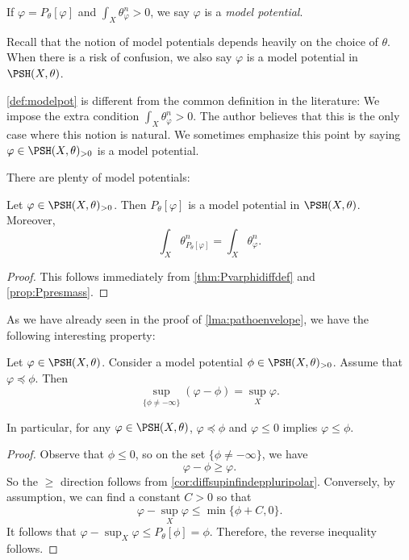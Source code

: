 \begin{definition}\label{def:modelpot}
    If $\varphi=P_{\theta}[\varphi]$ and $\int_X \theta_{\varphi}^n>0$, we say $\varphi$ is a \emph{model potential}.
\end{definition}
Recall that the notion of model potentials depends heavily on the choice of $\theta$. When there is a risk of confusion, we also say $\varphi$ is a model potential in $\PSH(X,\theta)$.

\begin{remark}\label{rmk:envelopes:L267}
\cref{def:modelpot} is different from the common definition in the literature: We impose the extra condition $\int_X \theta_{\varphi}^n>0$. The author believes that this is the only case where this notion is natural. We sometimes emphasize this point by saying $\varphi\in \PSH(X,\theta)_{>0}$ is a model potential.
\end{remark}

There are plenty of model potentials:
\begin{corollary}\label{cor:Psendspotentialtomodel}
    Let $\varphi\in \PSH(X,\theta)_{>0}$. Then $P_{\theta}[\varphi]$ is a model potential in $\PSH(X,\theta)$. Moreover,
    \[
        \int_X \theta_{P_{\theta}[\varphi]}^n=\int_X \theta_{\varphi}^n.
    \]
\end{corollary}
\begin{proof}
    This follows immediately from \cref{thm:Pvarphidiffdef} and \cref{prop:Ppresmass}.
\end{proof}

As we have already seen in the proof of \cref{lma:pathoenvelope}, we have the following interesting property:
\begin{proposition}\label{prop:model_sup_prop}
    Let $\varphi\in \PSH(X,\theta)$. Consider a model potential $\phi\in \PSH(X,\theta)_{>0}$. Assume that $\varphi\preceq \phi$. Then
    \[
    \sup_{\{\phi\neq -\infty\}} (\varphi-\phi)=\sup_X \varphi.
    \]
\end{proposition}
In particular, for any $\varphi\in \PSH(X,\theta)$, $\varphi\preceq \phi$ and $\varphi\leq 0$ implies $\varphi\leq \phi$.

\begin{proof}
    Observe that $\phi\leq 0$, so on the set $\{\phi\neq -\infty\}$, we have
    \[
    \varphi-\phi\geq \varphi.
    \]
    So the $\geq$ direction follows from \cref{cor:diffsupinfindeppluripolar}.
    Conversely, by assumption, we can find a constant $C>0$ so that
    \[
    \varphi-\sup_X \varphi\leq \min\{\phi+C,0 \}.
    \]
    It follows that $\varphi-\sup_X \varphi\leq P_{\theta}[\phi]=\phi$. Therefore, the reverse inequality follows.
\end{proof}



